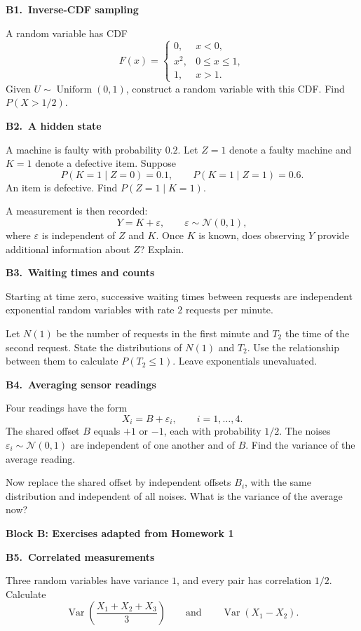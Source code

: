 \documentclass[11pt,a4paper]{article}
\newcommand{\blocktitle}[2]{{\Large\sffamily\bfseries\color{Ink}Block #1: #2}\par\vspace{5pt}}
\newenvironment{question}[2]{\par\addvspace{10pt}\begin{minipage}{\linewidth}{\sffamily\bfseries\color{Ink}#1.\ #2}\par\vspace{3pt}}{\end{minipage}\par}
\newcommand{\Var}{\operatorname{Var}}
\begin{document}
\begin{question}{B1}{Inverse-CDF sampling}
A random variable has CDF
\[
F(x)=\begin{cases}
0,&x<0,\\
x^2,&0\le x\le1,\\
1,&x>1.
\end{cases}
\]
Given $U\sim\operatorname{Uniform}(0,1)$, construct a random variable with
this CDF. Find $P(X>1/2)$.
\end{question}

\begin{question}{B2}{A hidden state}
A machine is faulty with probability $0.2$. Let $Z=1$ denote a faulty
machine and $K=1$ denote a defective item. Suppose
\[
P(K=1\mid Z=0)=0.1,\qquad P(K=1\mid Z=1)=0.6.
\]
An item is defective. Find $P(Z=1\mid K=1)$.

A measurement is then recorded:
\[
Y=K+\varepsilon,\qquad \varepsilon\sim\mathcal N(0,1),
\]
where $\varepsilon$ is independent of $Z$ and $K$. Once $K$ is known,
does observing $Y$ provide additional information about $Z$? Explain.
\end{question}

\begin{question}{B3}{Waiting times and counts}
Starting at time zero, successive waiting times between requests are
independent exponential random variables with rate $2$ requests per minute.

Let $N(1)$ be the number of requests in the first minute and $T_2$ the time
of the second request. State the distributions of $N(1)$ and $T_2$.
Use the relationship between them to calculate $P(T_2\le1)$.
Leave exponentials unevaluated.
\end{question}

\begin{question}{B4}{Averaging sensor readings}
Four readings have the form
\[
X_i=B+\varepsilon_i,\qquad i=1,\ldots,4.
\]
The shared offset $B$ equals $+1$ or $-1$, each with probability $1/2$.
The noises $\varepsilon_i\sim\mathcal N(0,1)$ are independent of one another
and of $B$. Find the variance of the average reading.

Now replace the shared offset by independent offsets $B_i$, with the same
distribution and independent of all noises. What is the variance of the
average now?
\end{question}

\newpage
\blocktitle{B}{Exercises adapted from Homework 1}
\begin{question}{B5}{Correlated measurements}
Three random variables have variance $1$, and every pair has correlation
$1/2$. Calculate
\[
\Var\left(\frac{X_1+X_2+X_3}{3}\right)
\qquad\text{and}\qquad
\Var(X_1-X_2).
\]
\end{question}
\end{document}

